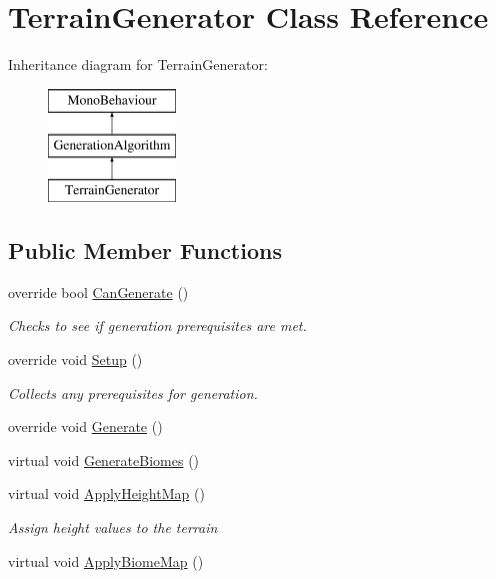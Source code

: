 \hypertarget{class_terrain_generator}{}\section{Terrain\+Generator Class Reference}
\label{class_terrain_generator}
Inheritance diagram for Terrain\+Generator\+:\begin{figure}[H]
\begin{center}
\leavevmode
\includegraphics[height=3.000000cm]{class_terrain_generator}
\end{center}
\end{figure}
\subsection*{Public Member Functions}
\begin{DoxyCompactItemize}
\item 
override bool \mbox{\hyperlink{class_terrain_generator_aecef659ebcfc0b012f4f8eb42e11f337}{Can\+Generate}} ()
\begin{DoxyCompactList}\small\item\em Checks to see if generation prerequisites are met. \end{DoxyCompactList}\item 
override void \mbox{\hyperlink{class_terrain_generator_ada250260b370382c1ba5cad243a67f10}{Setup}} ()
\begin{DoxyCompactList}\small\item\em Collects any prerequisites for generation. \end{DoxyCompactList}\item 
override void \mbox{\hyperlink{class_terrain_generator_ace92d2a3406204b124c51e91f68a0aec}{Generate}} ()
\item 
virtual void \mbox{\hyperlink{class_terrain_generator_ad39c135988960e8e12ea5bd36569336f}{Generate\+Biomes}} ()
\item 
virtual void \mbox{\hyperlink{class_terrain_generator_a9bbb5a5cfa43d7f38a8ef881b966ee26}{Apply\+Height\+Map}} ()
\begin{DoxyCompactList}\small\item\em Assign height values to the terrain \end{DoxyCompactList}\item 
virtual void \mbox{\hyperlink{class_terrain_generator_a8aac3ecefc24ee4f4018994ae29a1bba}{Apply\+Biome\+Map}} ()
\end{DoxyCompactItemize}
